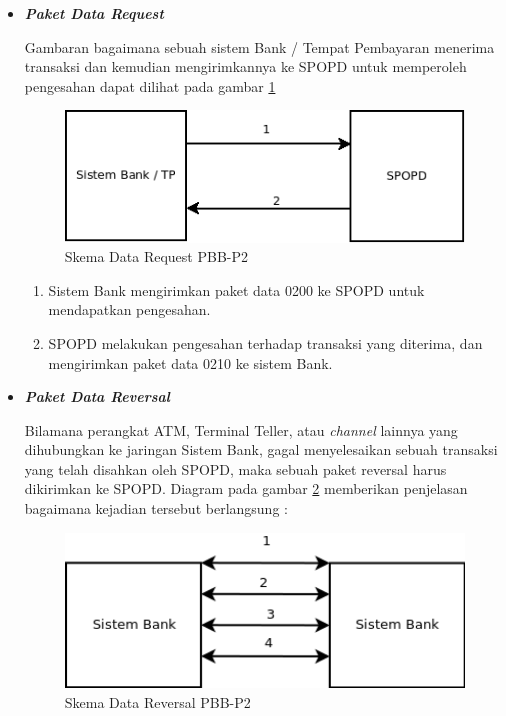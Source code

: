 \begin{itemize}

  \item \textbf{\textit{Paket Data Request}}
  
  Gambaran bagaimana sebuah sistem Bank / Tempat Pembayaran menerima transaksi dan kemudian mengirimkannya ke SPOPD untuk memperoleh pengesahan dapat dilihat pada gambar \ref{fig:data-request}
  
  \begin{figure}[H]
    \centering
    \includegraphics[width=1\textwidth]{./resources/dia-data-request}
    \caption{Skema Data Request PBB-P2}
    \label{fig:data-request}
  \end{figure}
  
  \begin{enumerate}[1.]
    \item Sistem Bank mengirimkan paket data 0200 ke SPOPD untuk mendapatkan pengesahan.
    \item SPOPD melakukan pengesahan terhadap transaksi yang diterima, dan mengirimkan paket data 0210 ke sistem Bank.
  \end{enumerate}
  
  \item \textbf{\textit{Paket Data Reversal}}
  
  Bilamana perangkat ATM, Terminal Teller, atau \textit{channel} lainnya yang dihubungkan ke jaringan Sistem Bank, gagal menyelesaikan sebuah transaksi yang telah disahkan oleh SPOPD, maka sebuah paket reversal harus dikirimkan ke SPOPD. Diagram pada gambar \ref{fig:proses-reversal} memberikan penjelasan bagaimana kejadian tersebut berlangsung :
  
  \begin{figure}[H]
    \centering
    \includegraphics[width=1\textwidth]{./resources/dia-reversal}
    \caption{Skema Data Reversal PBB-P2}
    \label{fig:proses-reversal}
  \end{figure}
  

\end{itemize}
